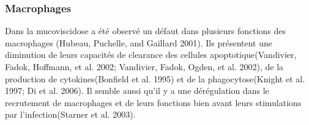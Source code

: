 			 \subsubsection{Macrophages}
Dans la mucoviscidose a été observé un défaut dans plusieurs fonctions des macrophages (Hubeau, Puchelle, and Gaillard 2001)\cite{hubeau_distinct_2001}. Ils présentent une diminution de leurs capacités de clearance des cellules apoptotique(Vandivier, Fadok, Hoffmann, et al. 2002; Vandivier, Fadok, Ogden, et al. 2002)\cite{vandivier_elastase-mediated_2002}\cite{vandivier_impaired_2002}, de la production de cytokines(Bonfield et al. 1995)\cite{bonfield_normal_1995} et de la phagocytose(Knight et al. 1997; Di et al. 2006)\cite{knight_defective_1997}\cite{di_cftr_2006}. Il semble aussi qu’il y a une dérégulation dans le recrutement de macrophages et de leurs fonctions bien avant leurs stimulations par l’infection(Starner et al. 2003)\cite{starner_ccl20_2003}. 

